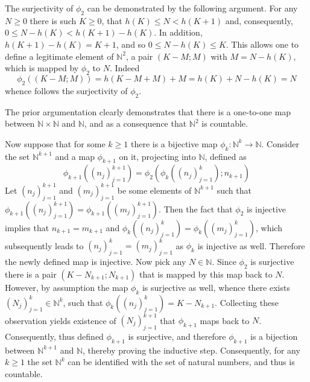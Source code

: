 \documentclass[a4paper]{article}
\newcommand{\brac}[1]{{\left({#1}\right)}}
\begin{document}
The surjectivity of $\phi_2$ can be demonstrated by the following argument. For any $N\geq 0$ there is such $K\geq 0$, that $h(K)\leq N < h(K+1)$ and, consequently, $0\leq N-h(K)<h(K+1)-h(K)$. In addition, $h(K+1)-h(K) = K+1$, and so $0\leq N-h(K)\leq K$. This allows one to define a legitimate element of $\mathbb{N}^2$, a pair $(K-M;M)$ with $M = N - h(K)$, which is mapped by $\phi_2$ to $N$. Indeed \[\phi_2\brac{(K-M;M)} = h(K - M + M) + M = h(K) + N - h(K) = N\] whence follows the surjectivity of $\phi_2$.

The prior argumentation clearly demonstrates that there is a one-to-one map between $\mathbb{N}\times \mathbb{N}$ and $\mathbb{N}$, and as a consequence that $\mathbb{N}^2$ is countable.

Now suppose that for some $k\geq 1$ there is a bijective map $\phi_k:\mathbb{N}^k\to\mathbb{N}$. Consider the set $\mathbb{N}^{k+1}$ and a map $\phi_{k+1}$ on it, projecting into $\mathbb{N}$, defined as \[\phi_{k+1}(\brac{n_j}_{j=1}^{k+1}) = \phi_2(\phi_k(\brac{n_j}_{j=1}^k);n_{k+1})\] Let $\brac{n_j}_{j=1}^{k+1}$ and $\brac{m_j}_{j=1}^{k+1}$ be some elements of $\mathbb{N}^{k+1}$ such that $\phi_{k+1}(\brac{n_j}_{j=1}^{k+1}) = \phi_{k+1}(\brac{m_j}_{j=1}^{k+1})$. Then the fact that $\phi_2$ is injective implies that $n_{k+1} = m_{k+1}$ and $\phi_k(\brac{n_j}_{j=1}^k)=\phi_k(\brac{m_j}_{j=1}^k)$, which subsequently leads to $\brac{n_j}_{j=1}^k=\brac{m_j}_{j=1}^k$ as $\phi_k$ is injective as well. Therefore the newly defined map is injective. Now pick any $N\in \mathbb{N}$. Since $\phi_2$ is surjective there is a pair $(K-N_{k+1};N_{k+1})$ that is mapped by this map back to $N$. However, by assumption the map $\phi_k$ is surjective as well, whence there exists $\brac{N_j}_{j=1}^k\in \mathbb{N}^k$, such that $\phi_k(\brac{n_j}_{j=1}^k) = K-N_{k+1}$. Collecting these observation yields existence of $\brac{N_j}_{j=1}^{k+1}$ that $\phi_{k+1}$ maps back to $N$. Consequently, thus defined $\phi_{k+1}$ is surjective, and therefore $\phi_{k+1}$ is a bijection between $\mathbb{N}^{k+1}$ and $\mathbb{N}$, thereby proving the inductive step.
Consequently, for any $k\geq 1$ the set $\mathbb{N}^k$ can be identified with the set of natural numbers, and thus is countable.
\end{document}
